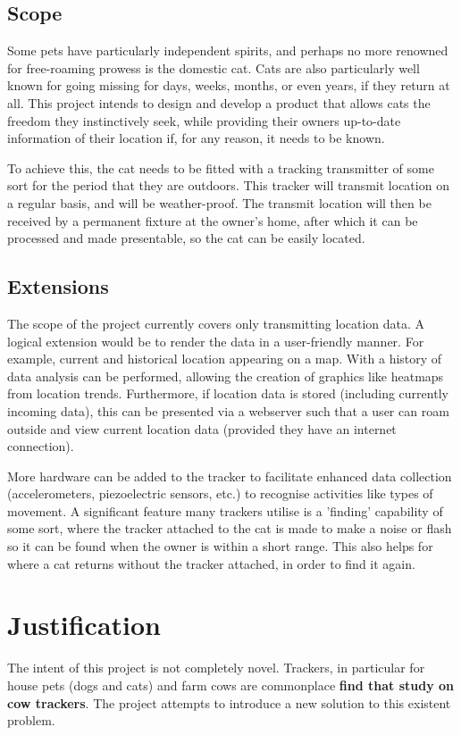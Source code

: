\documentclass[11pt]{article}
\begin{document}
\subsection{Scope}
Some pets have particularly independent spirits, and perhaps no more renowned for free-roaming prowess is the domestic cat.
Cats are also particularly well known for going missing for days, weeks, months, or even years, if they return at all.
This project intends to design and develop a product that allows cats the freedom they instinctively seek, 
while providing their owners up-to-date information of their location if, for any reason, it needs to be known.

To achieve this, the cat needs to be fitted with a tracking transmitter of some sort for the period that they are outdoors.
This tracker will transmit location on a regular basis, and will be weather-proof. 
The transmit location will then be received by a permanent fixture at the owner's home, 
after which it can be processed and made presentable, so the cat can be easily located. 

\subsection{Extensions}
The scope of the project currently covers only transmitting location data.
A logical extension would be to render the data in a user-friendly manner.
For example, current and historical location appearing on a map.
With a history of data analysis can be performed, allowing the creation of graphics like heatmaps from location trends. 
Furthermore, if location data is stored (including currently incoming data), 
this can be presented via a webserver such that a user can roam outside and view current location data 
(provided they have an internet connection).

More hardware can be added to the tracker to facilitate enhanced data collection
(accelerometers, piezoelectric sensors, etc.) to recognise activities like types of movement.
A significant feature many trackers utilise is a 'finding' capability of some sort, where the tracker attached to the cat is made to make a noise or flash so it can be found when the owner is within a short range.
This also helps for where a cat returns without the tracker attached, in order to find it again.

\section{Justification}
The intent of this project is not completely novel. Trackers, in particular for house pets (dogs and cats) and farm cows are commonplace \textbf{find that study on cow trackers}.
The project attempts to introduce a new solution to this existent problem.
\end{document}
